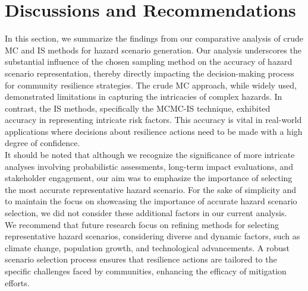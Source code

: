 \section{Discussions and Recommendations}
    In this section, we summarize the findings from our comparative analysis of crude MC and IS methods for hazard scenario generation. Our analysis underscores the substantial influence of the chosen sampling method on the accuracy of hazard scenario representation, thereby directly impacting the decision-making process for community resilience strategies. The crude MC approach, while widely used, demonstrated limitations in capturing the intricacies of complex hazards. In contrast, the IS methods, specifically the MCMC-IS technique, exhibited accuracy in representing intricate risk factors. This accuracy is vital in real-world applications where decisions about resilience actions need to be made with a high degree of confidence.\\
    It should be noted that although we recognize the significance of more intricate analyses involving probabilistic assessments, long-term impact evaluations, and stakeholder engagement, our aim was to emphasize the importance of selecting the most accurate representative hazard scenario. For the sake of simplicity and to maintain the focus on showcasing the importance of accurate hazard scenario selection, we did not consider these additional factors in our current analysis.\\
    We recommend that future research focus on refining methods for selecting representative hazard scenarios, considering diverse and dynamic factors, such as climate change, population growth, and technological advancements. A robust scenario selection process ensures that resilience actions are tailored to the specific challenges faced by communities, enhancing the efficacy of mitigation efforts.